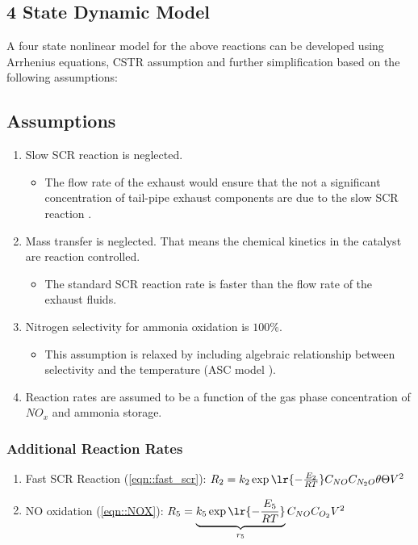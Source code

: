 \subsection{4 State Dynamic Model}
A four state nonlinear model for the above reactions can be developed using
Arrhenius equations, CSTR assumption and further simplification based on the
following assumptions:

\subsection{Assumptions}
\begin{enumerate}
    \item Slow SCR reaction is neglected.
    \begin{itemize}
        \item The flow rate of the exhaust would ensure that the not a significant concentration of tail-pipe exhaust components are due to the slow SCR reaction \cite{nova2014urea}.
    \end{itemize}

    \item Mass transfer is neglected. That means the chemical kinetics in the catalyst are reaction controlled.
    \begin{itemize}
        \item The standard SCR reaction rate is faster than the flow rate of the exhaust fluids.
    \end{itemize}

    \item Nitrogen selectivity for ammonia oxidation is $100\%$.
    \begin{itemize}
        \item This assumption is relaxed by including algebraic relationship between selectivity and the temperature (ASC model \cite{jain2023diagnostics}).
    \end{itemize}

    \item Reaction rates are assumed to be a function of the gas phase concentration of $NO_x$ and ammonia storage.
\end{enumerate}

\subsubsection{Additional Reaction Rates}
\begin{enumerate}
\item Fast SCR Reaction (\ref{eqn::fast_scr}):
$ R_2 = k_2 \exp\lr{-\frac{E_2}{RT}} C_{NO} C_{N_2O} \theta \Theta V^2 $
\item NO oxidation (\ref{eqn::NOX}):
$ R_5 = \underbrace{k_5 \exp \lr{- \frac{E_5}{RT}}}_{r_5} C_{NO} C_{O_2} V^2 $
\end{enumerate}

